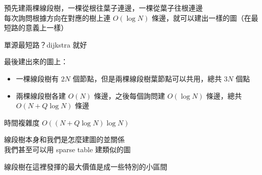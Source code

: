 \begin{frame}{\ebtitle}
\begin{figure}[h!]
\begin{center}
        \end{center}
    \end{figure}
\end{frame}

\begin{frame}{\ebtitle}
    預先建兩棵線段樹，一棵從根往葉子連邊，一棵從葉子往根連邊 \\
    每次詢問根據方向在對應的樹上連 $O(\log N)$ 條邊，就可以建出一樣的圖（在最短路的意義上一樣）

    單源最短路？dijkstra 就好
\end{frame}

\begin{frame}{\ebtitle}
    最後建出來的圖上：
    \begin{itemize}
        \item 一棵線段樹有 $2N$ 個節點，但是兩棵線段樹葉節點可以共用，總共 $3N$ 個點
        \item 兩棵線段樹各建 $O(N)$ 條邊，之後每個詢問建 $O(\log N)$ 條邊，總共 $O(N + Q \log N)$ 條邊
    \end{itemize}
    時間複雜度 $O((N + Q \log N) \log N)$
\end{frame}

\begin{frame}{\ebtitle}
    線段樹本身和我們是怎麼建圖的並關係 \\
    我們甚至可以用 sparse table 建類似的圖

    線段樹在這裡發揮的最大價值是成一些特別的小區間
\end{frame}
